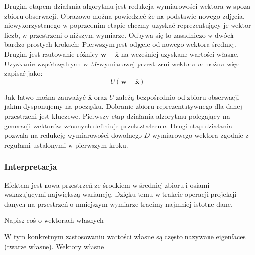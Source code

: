 \documentclass{article}
\newcommand{\bb}{\textbf}
\begin{document}
Drugim etapem działania algorytmu jest redukcja wymiarowości wektora $\bb{w}$ spoza zbioru obserwacji. Obrazowo można powiedzieć że na podstawie nowego zdjęcia, niewykorzystanego w poprzednim etapie chcemy uzyskać reprezentujący je wektor liczb, w przestrzeni o niższym wymiarze. Odbywa się to zasadniczo w dwóch bardzo prostych krokach: Pierwszym jest odjęcie od nowego wektora średniej. Drugim jest rzutowanie różnicy $\bb{w} - \overline{\bb{x}}$ na wcześniej uzyskane wartości własne. Uzyskanie współrzędnych w $M$-wymiarowej przestrzeni wektora $w$ można więc zapisać jako:
\begin{equation}
	U ( \bb{w} - \overline{\bb{x}} ) 
\end{equation}

Jak łatwo można zauważyć $\overline{\bb{x}}$ oraz $U$ zależą bezpośrednio od zbioru obserwacji jakim dysponujemy na początku. Dobranie zbioru reprezentatywnego dla danej przestrzeni jest kluczowe. Pierwszy etap działania algorytmu polegający na generacji wektorów własnych definiuje przekształcenie. Drugi etap działania pozwala na redukcję wymiarowości dowolnego $D$-wymiarowego wektora zgodnie z regułami ustalonymi w pierwszym kroku.

\subsubsection{Interpretacja}
Efektem jest nowa przestrzeń ze środkiem w średniej zbioru i osiami wskazującymi największą wariancję. Dzięku temu w trakcie operacji projekcji danych na przestrzeń o mniejszym wymiarze tracimy najmniej istotne dane. 

Napisz coś o wektorach własnych

W tym konkretnym zastosowaniu wartości własne są często nazywane eigenfaces (twarze własne). Wektory własne 
\end{document}
